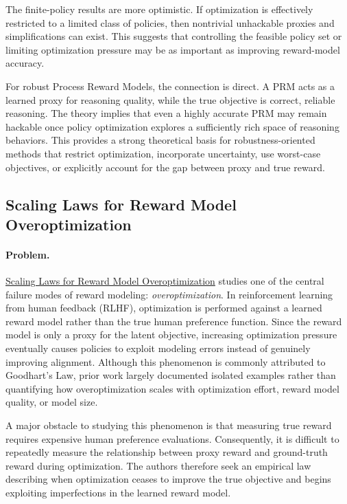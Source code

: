 \documentclass[11pt]{article}
\begin{document}
The finite-policy results are more optimistic. If optimization is effectively restricted to a limited class of policies, then nontrivial unhackable proxies and simplifications can exist. This suggests that controlling the feasible policy set or limiting optimization pressure may be as important as improving reward-model accuracy.

For robust Process Reward Models, the connection is direct. A PRM acts as a learned proxy for reasoning quality, while the true objective is correct, reliable reasoning. The theory implies that even a highly accurate PRM may remain hackable once policy optimization explores a sufficiently rich space of reasoning behaviors. This provides a strong theoretical basis for robustness-oriented methods that restrict optimization, incorporate uncertainty, use worst-case objectives, or explicitly account for the gap between proxy and true reward.

\subsection{Scaling Laws for Reward Model Overoptimization}


\paragraph{Problem.}

\href{https://arxiv.org/pdf/2210.10760}{Scaling Laws for Reward Model Overoptimization}
 studies one of the central failure modes of reward modeling: \emph{overoptimization}. In reinforcement learning from human feedback (RLHF), optimization is performed against a learned reward model rather than the true human preference function. Since the reward model is only a proxy for the latent objective, increasing optimization pressure eventually causes policies to exploit modeling errors instead of genuinely improving alignment. Although this phenomenon is commonly attributed to Goodhart's Law, prior work largely documented isolated examples rather than quantifying how overoptimization scales with optimization effort, reward model quality, or model size.

A major obstacle to studying this phenomenon is that measuring true reward requires expensive human preference evaluations. Consequently, it is difficult to repeatedly measure the relationship between proxy reward and ground-truth reward during optimization. The authors therefore seek an empirical law describing when optimization ceases to improve the true objective and begins exploiting imperfections in the learned reward model.
\end{document}
